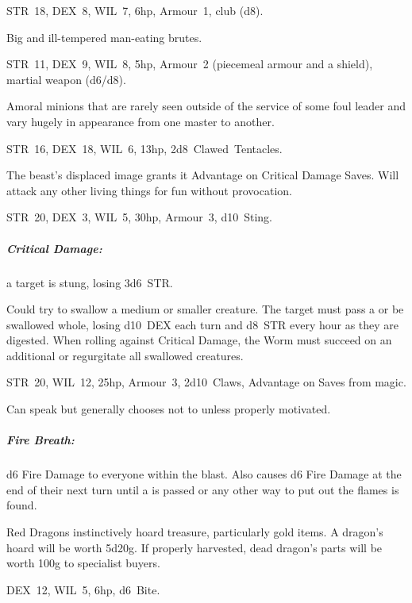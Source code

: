 \documentclass[itdr]{subfiles}
\begin{document}
\vfill

STR~18, DEX~8, WIL~7, 6hp, Armour~1, club (d8).

Big and ill-tempered man-eating brutes.

\vfill

STR~11, DEX~9, WIL~8, 5hp, Armour~2 (piecemeal armour and a shield), martial weapon (d6/d8).

Amoral minions that are rarely seen outside of the service of some foul leader and vary hugely in appearance from one master to another.

\vfill

STR~16, DEX~18, WIL~6, 13hp, 2d8~Clawed~Tentacles.

The beast's displaced image grants it Advantage on Critical Damage Saves. Will attack any other living things for fun without provocation.

\vfill
\break

\vfill
{}

STR~20, DEX~3, WIL~5, 30hp, Armour~3, d10~Sting.

\subparagraph{Critical Damage:} a target is stung, losing 3d6~STR.

Could try to swallow a medium or smaller creature. The target must pass a  or be swallowed whole, losing d10~DEX each turn and d8~STR every hour as they are digested. When rolling against Critical Damage, the Worm must succeed on an additional  or regurgitate all swallowed creatures.

\vfill

STR~20, WIL~12, 25hp, Armour~3, 2d10~Claws, Advantage on Saves from magic.

Can speak but generally chooses not to unless properly motivated.

\subparagraph{Fire Breath:} d6 Fire Damage to everyone within the blast. Also causes d6 Fire Damage at the end of their next turn until a  is passed or any other way to put out the flames is found.

Red Dragons instinctively hoard treasure, particularly gold items. A dragon's hoard will be worth 5d20g. If properly harvested, dead dragon's parts will be worth 100g to specialist buyers.

\vfill
\break

\vfill

DEX~12, WIL~5, 6hp, d6~Bite.
\end{document}
